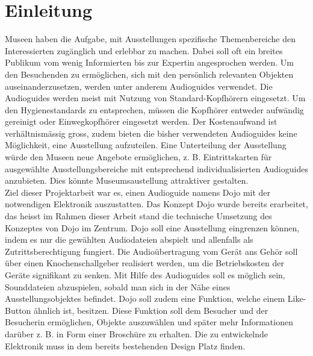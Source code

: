 \chapter{Einleitung}
\thispagestyle{fancy}  \setcounter{page}{1}

Museen haben die Aufgabe, mit Ausstellungen spezifische Themenbereiche den Interessierten zugänglich und erlebbar zu machen. Dabei soll oft ein breites Publikum vom wenig Informierten bis zur Expertin angesprochen werden. Um den Besuchenden zu ermöglichen, sich mit den persönlich relevanten Objekten auseinanderzusetzen, werden unter anderem Audioguides verwendet. Die Audioguides werden meist mit Nutzung von Standard-Kopfhörern eingesetzt. Um den Hygienestandards zu entsprechen, müssen die Kopfhörer entweder aufwändig gereinigt oder Einwegkopfhörer eingesetzt werden. Der Kostenaufwand ist verhältnismässig gross, zudem bieten die bisher verwendeten Audioguides keine Möglichkeit, eine Ausstellung aufzuteilen. Eine Unterteilung der Ausstellung würde den Museen neue Angebote ermöglichen, z. B. Eintrittskarten für ausgewählte Ausstellungsbereiche mit entsprechend individualisierten Audioguides anzubieten. Dies könnte Museumsaustellung attraktiver gestalten. \\

Ziel dieser Projektarbeit war es, einen Audioguide namens Dojo mit der notwendigen Elektronik auszustatten. Das Konzept Dojo wurde bereits erarbeitet, das heisst im Rahmen dieser Arbeit stand die technische Umsetzung des Konzeptes von Dojo im Zentrum. Dojo soll eine Ausstellung eingrenzen können, indem es nur die gewählten Audiodateien abspielt und allenfalls als Zutrittsberechtigung fungiert.  Die Audioübertragung vom Gerät ans Gehör soll über einen Knochenschallgeber realisiert werden, um die Betriebskosten der Geräte signifikant zu senken. Mit Hilfe des Audioguides soll es möglich sein, Sounddateien abzuspielen, sobald man sich in der Nähe eines Ausstellungsobjektes befindet. Dojo soll zudem eine Funktion, welche einem Like-Button ähnlich ist, besitzen. Diese Funktion soll dem Besucher und der Besucherin ermöglichen, Objekte auszuwählen und später mehr Informationen darüber z. B. in Form einer Broschüre zu erhalten. Die zu entwickelnde Elektronik muss in dem bereits bestehenden Design Platz finden. \\

